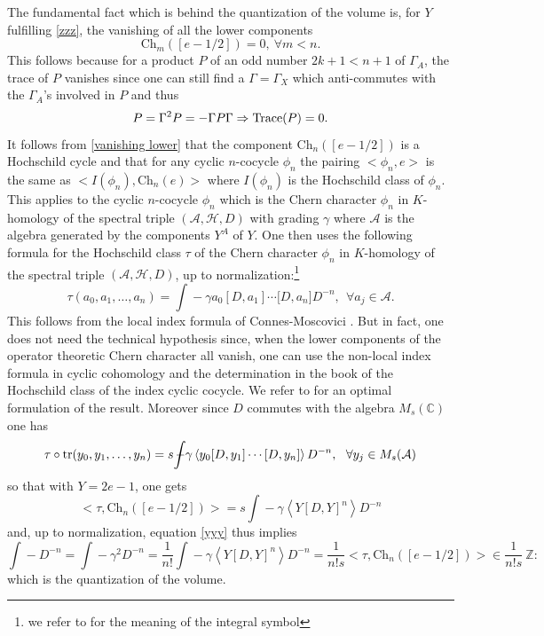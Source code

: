 \documentclass[12pt]{article}
\def\tr{{\rm tr}}
\def\C{{\mathbb C}}
\def\Z{{\mathbb Z}}
\def\tr{{\rm tr}}
\begin{document}
The fundamental fact which is behind the quantization of the volume is, for $Y$ fulfilling \eqref{zzz}, the vanishing of all the lower components 
\begin{equation}\label{vanishing lower}
	\mathrm{Ch}_{m}([e-1/2])=0, \ \forall m<n.
\end{equation}
This follows because for a product $P$ of an odd number $2k+1<n+1$ of $\Gamma_A$, the trace of $P$ vanishes since one can still find a $\Gamma=\Gamma_X$ which anti-commutes with the $\Gamma_A$'s involved in $P$ and thus 
$$
P=\Gamma^2 P=-\Gamma P \Gamma\Rightarrow {\rm Trace}(P)=0. 
$$
It follows from \eqref{vanishing lower} that the component $\mathrm{Ch}_{n}([e-1/2])$ is a Hochschild cycle and
that for any cyclic $n$-cocycle $\phi_{n}$ the pairing $<\phi_{n},e>$ is the
same as $<I(\phi_{n}),\mathrm{Ch}_{n}(e)>$ where $I(\phi_{n})$ is the
Hochschild class of $\phi_{n}$. This applies to the cyclic $n$-cocycle
$\phi_{n}$ which is the Chern character $\phi_{n}$ in $K$-homology of the
spectral triple $(\mathcal{A},\mathcal{H},D)$ with grading $\gamma$ where
$\mathcal{A}$ is the algebra generated by the components $Y^{A}$ of $Y$. One then uses the following formula for the Hochschild class $\tau$ of the Chern character $\phi_{n}$ in $K$-homology of the
spectral triple $(\mathcal{A},\mathcal{H},D)$, up to normalization:\footnote{we refer to \cite{Co-book} for the meaning of the integral symbol}
\[
\tau(a_{0},a_{1},\ldots,a_{n})={\int\!\!\!\!\!\!-}\gamma a_{0}[D,a_{1}%
]\cdots\lbrack D,a_{n}]D^{-n},\ \ \forall a_{j}\in\mathcal{A}.
\]
This follows from the local index formula of Connes-Moscovici \cite{cmindex}. But in fact, one does
not need the technical hypothesis  since, when the lower
components of the operator theoretic Chern character all vanish, one can use
the non-local index formula in cyclic cohomology and the determination in
the  book \cite{Co-book} of the Hochschild class of the
index cyclic cocycle. We refer to \cite{carey} for an optimal formulation of the result. 
Moreover since $D$  commutes with the algebra $M_s(\C)$ one has
$$
\tau\circ \tr (y_{0},y_{1},\ldots,y_{n})=s{\int\!\!\!\!\!\!-}\gamma \left\langle y_{0}[D,y_{1}%
]\cdots\lbrack D,y_{n}]\right\rangle D^{-n},\ \ \forall y_{j}\in M_s(\mathcal{A})
$$
 so that with $Y=2e-1$, one gets
\[
<\tau,\mathrm{Ch}_{n}([e-1/2])>=s{\int\!\!\!\!\!\!-}\gamma\left\langle Y\left[
D,Y\right]  ^{n}\right\rangle D^{-n}%
\]
and, up to normalization, equation \eqref{yyy} thus implies
$$
{\int\!\!\!\!\!\!-}D^{-n}={\int\!\!\!\!\!\!-}\gamma^2 D^{-n}=\frac{1}{n!}
{\int\!\!\!\!\!\!-}\gamma\left\langle Y\left[
D,Y\right]  ^{n}\right\rangle D^{-n}=\frac{1}{n!s}<\tau,\mathrm{Ch}_{n}([e-1/2])>\in \frac{1}{n!s}\ \Z:
$$
which is the quantization of the volume.
\end{document}
